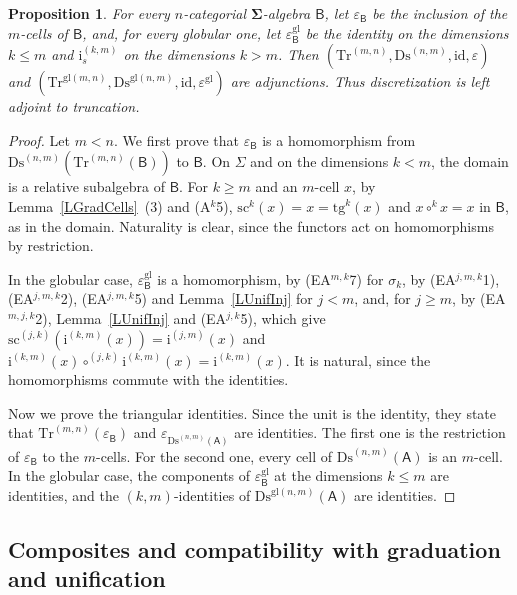 \documentclass[a4paper,reqno]{amsart}
\newcommand{\sig}[1]{\mathbf{#1}}                %
\newcommand{\calg}[1]{\boldsymbol{\mathsf{#1}}}  %
\newcommand{\id}{\mathrm{id}}
\newcommand{\gl}{\mathrm{gl}}
\newcommand{\src}{\mathrm{sc}}
\newcommand{\tgt}{\mathrm{tg}}
\newcommand{\ii}{\mathrm{i}}
\newcommand{\Ds}{\mathrm{Ds}}
\newcommand{\Tr}{\mathrm{Tr}}
\theoremstyle{plain}
\newtheorem{proposition}[theorem]{Proposition}
\theoremstyle{definition}
\begin{document}
\begin{proposition}\label{PDiscTruncAdj}
For every $n$-categorial $\sig{\Sigma}$-algebra $\calg{B}$, let $\varepsilon_{\calg{B}}$ be the inclusion of the $m$-cells of $\calg{B}$, and, for every globular one, let $\varepsilon^{\gl}_{\calg{B}}$ be the identity on the dimensions $k\leq m$ and $\ii^{(k,m)}_{s}$ on the dimensions $k>m$.
Then $(\Tr^{(m,n)},\Ds^{(n,m)},\id,\varepsilon)$ and $(\Tr^{\gl(m,n)},\Ds^{\gl(n,m)},\id,\varepsilon^{\gl})$ are adjunctions.
Thus discretization is left adjoint to truncation.
\end{proposition}
\begin{proof}
Let $m<n$.
We first prove that $\varepsilon_{\calg{B}}$ is a homomorphism from $\Ds^{(n,m)}(\Tr^{(m,n)}(\calg{B}))$ to $\calg{B}$.
On $\Sigma$ and on the dimensions $k<m$, the domain is a relative subalgebra of $\calg{B}$.
For $k\geq m$ and an $m$-cell $x$, by Lemma~\ref{LGradCells}~(3) and (A$^{k}$5), $\src^{k}(x)=x=\tgt^{k}(x)$ and $x\circ^{k}x=x$ in $\calg{B}$, as in the domain.
Naturality is clear, since the functors act on homomorphisms by restriction.

In the globular case, $\varepsilon^{\gl}_{\calg{B}}$ is a homomorphism, by (EA$^{m,k}$7) for $\sigma_{k}$, by (EA$^{j,m,k}$1), (EA$^{j,m,k}$2), (EA$^{j,m,k}$5) and Lemma~\ref{LUnifInj} for $j<m$, and, for $j\geq m$, by (EA$^{m,j,k}$2), Lemma~\ref{LUnifInj} and (EA$^{j,k}$5), which give $\src^{(j,k)}(\ii^{(k,m)}(x))=\ii^{(j,m)}(x)$ and $\ii^{(k,m)}(x)\circ^{(j,k)}\ii^{(k,m)}(x)=\ii^{(k,m)}(x)$.
It is natural, since the homomorphisms commute with the identities.

Now we prove the triangular identities.
Since the unit is the identity, they state that $\Tr^{(m,n)}(\varepsilon_{\calg{B}})$ and $\varepsilon_{\Ds^{(n,m)}(\calg{A})}$ are identities.
The first one is the restriction of $\varepsilon_{\calg{B}}$ to the $m$-cells.
For the second one, every cell of $\Ds^{(n,m)}(\calg{A})$ is an $m$-cell.
In the globular case, the components of $\varepsilon^{\gl}_{\calg{B}}$ at the dimensions $k\leq m$ are identities, and the $(k,m)$-identities of $\Ds^{\gl(n,m)}(\calg{A})$ are identities.
\end{proof}

\subsection{Composites and compatibility with graduation and unification}
\end{document}
